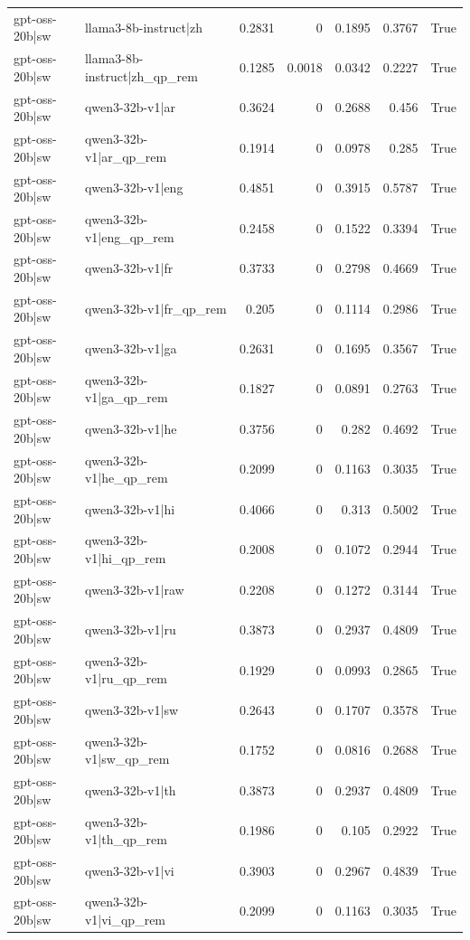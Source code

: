 \begin{table}
\begin{tabular}{l l r r r r l}
gpt-oss-20b|sw & llama3-8b-instruct|zh & 0.2831 & 0 & 0.1895 & 0.3767 & True \\
gpt-oss-20b|sw & llama3-8b-instruct|zh_qp_rem & 0.1285 & 0.0018 & 0.0342 & 0.2227 & True \\
gpt-oss-20b|sw & qwen3-32b-v1|ar & 0.3624 & 0 & 0.2688 & 0.456 & True \\
gpt-oss-20b|sw & qwen3-32b-v1|ar_qp_rem & 0.1914 & 0 & 0.0978 & 0.285 & True \\
gpt-oss-20b|sw & qwen3-32b-v1|eng & 0.4851 & 0 & 0.3915 & 0.5787 & True \\
gpt-oss-20b|sw & qwen3-32b-v1|eng_qp_rem & 0.2458 & 0 & 0.1522 & 0.3394 & True \\
gpt-oss-20b|sw & qwen3-32b-v1|fr & 0.3733 & 0 & 0.2798 & 0.4669 & True \\
gpt-oss-20b|sw & qwen3-32b-v1|fr_qp_rem & 0.205 & 0 & 0.1114 & 0.2986 & True \\
gpt-oss-20b|sw & qwen3-32b-v1|ga & 0.2631 & 0 & 0.1695 & 0.3567 & True \\
gpt-oss-20b|sw & qwen3-32b-v1|ga_qp_rem & 0.1827 & 0 & 0.0891 & 0.2763 & True \\
gpt-oss-20b|sw & qwen3-32b-v1|he & 0.3756 & 0 & 0.282 & 0.4692 & True \\
gpt-oss-20b|sw & qwen3-32b-v1|he_qp_rem & 0.2099 & 0 & 0.1163 & 0.3035 & True \\
gpt-oss-20b|sw & qwen3-32b-v1|hi & 0.4066 & 0 & 0.313 & 0.5002 & True \\
gpt-oss-20b|sw & qwen3-32b-v1|hi_qp_rem & 0.2008 & 0 & 0.1072 & 0.2944 & True \\
gpt-oss-20b|sw & qwen3-32b-v1|raw & 0.2208 & 0 & 0.1272 & 0.3144 & True \\
gpt-oss-20b|sw & qwen3-32b-v1|ru & 0.3873 & 0 & 0.2937 & 0.4809 & True \\
gpt-oss-20b|sw & qwen3-32b-v1|ru_qp_rem & 0.1929 & 0 & 0.0993 & 0.2865 & True \\
gpt-oss-20b|sw & qwen3-32b-v1|sw & 0.2643 & 0 & 0.1707 & 0.3578 & True \\
gpt-oss-20b|sw & qwen3-32b-v1|sw_qp_rem & 0.1752 & 0 & 0.0816 & 0.2688 & True \\
gpt-oss-20b|sw & qwen3-32b-v1|th & 0.3873 & 0 & 0.2937 & 0.4809 & True \\
gpt-oss-20b|sw & qwen3-32b-v1|th_qp_rem & 0.1986 & 0 & 0.105 & 0.2922 & True \\
gpt-oss-20b|sw & qwen3-32b-v1|vi & 0.3903 & 0 & 0.2967 & 0.4839 & True \\
gpt-oss-20b|sw & qwen3-32b-v1|vi_qp_rem & 0.2099 & 0 & 0.1163 & 0.3035 & True \\

\end{tabular}
\end{table}
